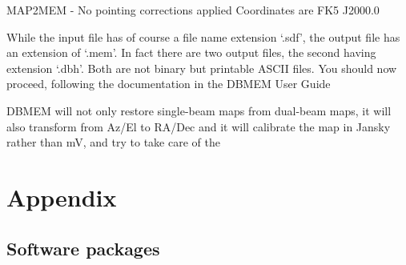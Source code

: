 \documentclass[11pt,noabs]{starlink}
\begin{document}
\begin{terminalv}
MAP2MEM - No pointing corrections applied
Coordinates are FK5 J2000.0
\end{terminalv}

   While the input file has of course a file name extension `.sdf', the
   output file has an extension of `.mem'. In fact there are two output
   files, the second having extension `.dbh'. Both are not binary but
   printable ASCII files. You should now proceed, following the
   documentation in the DBMEM User Guide

   DBMEM will not only restore single-beam maps from dual-beam maps, it
   will also transform from Az/El to RA/Dec and it will calibrate the
   map in Jansky rather than mV, and try to take care of the


\newpage
\appendix
\section{Appendix}

\subsection{\label{packs}Software packages}
\end{document}
